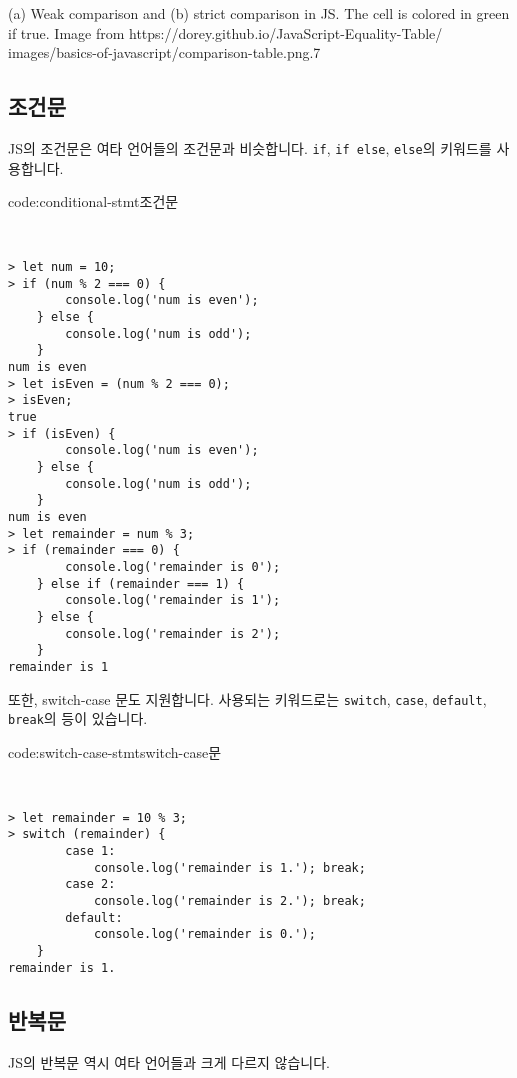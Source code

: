     {(a) Weak comparison and (b) strict comparison in JS. The cell is colored in green if true. Image from https://dorey.github.io/JavaScript-Equality-Table/}
    {images/basics-of-javascript/comparison-table.png}{.7}

\subsection*{조건문}

JS의 조건문은 여타 언어들의 조건문과 비슷합니다. \verb|if|, \verb|if else|, \verb|else|의 키워드를 사용합니다. 

\begin{codeenv}{code:conditional-stmt}{조건문}\begin{verbatim}


> let num = 10;
> if (num % 2 === 0) {
        console.log('num is even');
    } else {
        console.log('num is odd');
    }
num is even
> let isEven = (num % 2 === 0);
> isEven;
true
> if (isEven) {
        console.log('num is even');
    } else {
        console.log('num is odd');
    }
num is even
> let remainder = num % 3;
> if (remainder === 0) {
        console.log('remainder is 0');
    } else if (remainder === 1) {
        console.log('remainder is 1');
    } else {
        console.log('remainder is 2');
    }
remainder is 1
\end{verbatim}
\end{codeenv}

또한, switch-case 문도 지원합니다. 사용되는 키워드로는 \verb|switch|, \verb|case|, \verb|default|, \verb|break|의 등이 있습니다. 

\begin{codeenv}{code:switch-case-stmt}{switch-case문}\begin{verbatim}


> let remainder = 10 % 3;
> switch (remainder) {
        case 1:
            console.log('remainder is 1.'); break;
        case 2:
            console.log('remainder is 2.'); break;
        default:
            console.log('remainder is 0.');
    }
remainder is 1.
\end{verbatim}
\end{codeenv}

\subsection*{반복문}

JS의 반복문 역시 여타 언어들과 크게 다르지 않습니다. 

